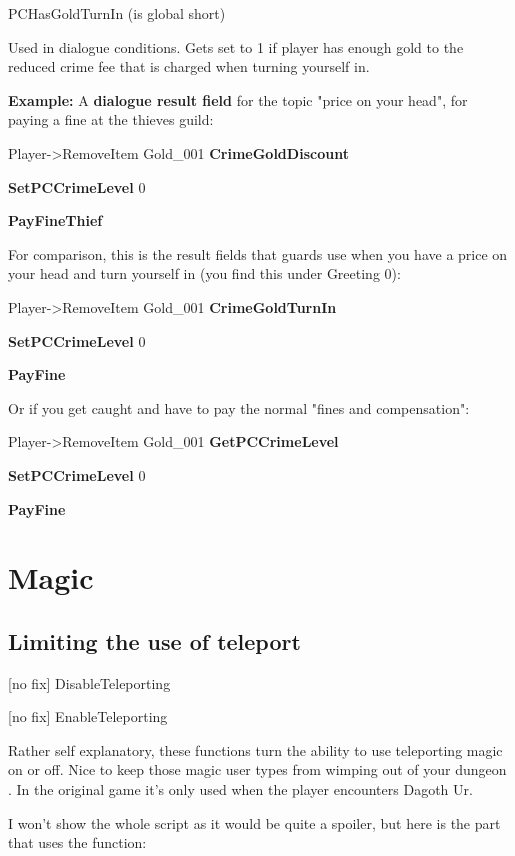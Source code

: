 PCHasGoldTurnIn (is global short)

Used in dialogue conditions. Gets set to 1 if player has enough gold to
the reduced crime fee that is charged when turning yourself in.

\textbf{Example:} A \textbf{dialogue result field} for the topic "price
on your head", for paying a fine at the thieves guild:

Player-\textgreater RemoveItem Gold\_001 \textbf{CrimeGoldDiscount}

\textbf{SetPCCrimeLevel} 0

\textbf{PayFineThief}

For comparison, this is the result fields that guards use when you have
a price on your head and turn yourself in (you find this under Greeting
0):

Player-\textgreater RemoveItem Gold\_001 \textbf{CrimeGoldTurnIn}

\textbf{SetPCCrimeLevel} 0

\textbf{PayFine}

Or if you get caught and have to pay the normal "fines and
compensation":

Player-\textgreater RemoveItem Gold\_001 \textbf{GetPCCrimeLevel}

\textbf{SetPCCrimeLevel} 0

\textbf{PayFine}

\hypertarget{magic}{%
\section{\texorpdfstring{\hfill\break
Magic}{ Magic}}\label{magic}}

\hypertarget{limiting-the-use-of-teleport}{%
\subsection{Limiting the use of
teleport}\label{limiting-the-use-of-teleport}}

{[}no fix{]} DisableTeleporting

{[}no fix{]} EnableTeleporting

Rather self explanatory, these functions turn the ability to use
teleporting magic on or off. Nice to keep those magic user types from
wimping out of your dungeon . In the original game it's only used when
the player encounters Dagoth Ur.

I won't show the whole script as it would be quite a spoiler, but here
is the part that uses the function:

